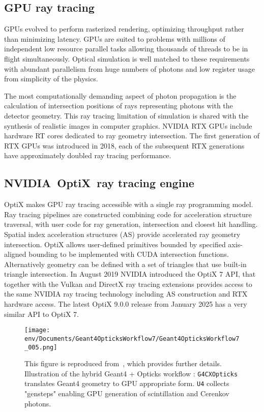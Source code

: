\documentclass{webofc}
\begin{document}
\subsection{GPU ray tracing}%
%
GPUs evolved to perform rasterized rendering, optimizing throughput\cite{throughput} rather than minimizing latency.
GPUs are suited to problems with millions of independent low resource parallel tasks allowing thousands of threads 
to be in flight simultaneously.
Optical simulation is well matched to these requirements with abundant parallelism 
from huge numbers of photons and low register usage from simplicity of the physics.

The most computationally demanding aspect of photon propagation
is the calculation of intersection positions of rays representing photons with the detector geometry.
This ray tracing limitation of simulation is shared with the synthesis of realistic images in computer graphics. 
NVIDIA RTX\cite{rtx} GPUs include hardware RT cores dedicated to ray geometry intersection. 
The first generation of RTX GPUs was introduced in 2018, each of the subsequent RTX generations have 
approximately doubled ray tracing performance.  
%
%
\subsection{NVIDIA\textregistered\ OptiX\texttrademark\ ray tracing engine}
%
OptiX\cite{optix} makes GPU ray tracing accessible with a single ray programming model.
Ray tracing pipelines are constructed combining code for acceleration structure traversal, 
with user code for ray generation, intersection and closest hit handling.
Spatial index acceleration structures (AS) provide accelerated ray geometry intersection. 
%
OptiX allows user-defined primitives bounded by specified axis-aligned bounding
to be implemented with CUDA intersection functions. Alternatively geometry can be 
defined with a set of triangles that use built-in triangle intersection.  
%
In August 2019 NVIDIA introduced the OptiX 7 API,
that together with the Vulkan and DirectX ray tracing extensions provides access 
to the same NVIDIA ray tracing technology including AS construction and RTX hardware access. 
The latest OptiX 9.0.0 release from January 2025 has a very similar API to OptiX 7.   
%
%
\begin{figure}[t]
\centering
\texttt{[image: env/Documents/Geant4OpticksWorkflow7/Geant4OpticksWorkflow7\_005.png]}
\caption{This figure is reproduced from~\cite{chep2023}, which provides further details. Illustration of the
hybrid Geant4 + Opticks workflow : {\tt G4CXOpticks} translates Geant4 geometry to GPU appropriate form. 
{\tt U4} collects "gensteps" enabling GPU generation of scintillation and Cerenkov photons. 
}
\label{workflow} 
\vspace{-5mm}
\end{figure}
%
\end{document}
